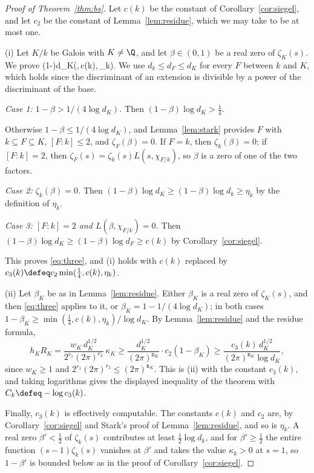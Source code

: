 \documentclass[11pt, reqno, twoside, letterpaper]{amsart}
\newcommand{\dK}{{\mathtt{n}_K}}
\newcommand{\Kf}{K}
\begin{document}
\begin{proof}[Proof of Theorem~\ref{thm:bs}]
Let $c(k)$ be the constant of Corollary~\ref{cor:siegel}, and let
$c_2$ be the constant of Lemma~\ref{lem:residue}, which we may take
to be at most one.

(i) Let $\Kf/k$ be Galois with $\Kf\ne\Q$, and let $\beta\in(0,1)$
be a real zero of $\zeta_\Kf(s)$. We prove
\be\label{eq:three}
(1-\beta)\log d_\Kf\ge\min\big(,\,c(k),\,\eta_k\big).
\ee
We use $d_k\le d_F\le d_\Kf$ for every
$F$ between $k$ and $\Kf$, which holds since the discriminant of an
extension is divisible by a power of the discriminant of the base.

\emph{Case 1: $1-\beta>1/(4\log d_\Kf)$.} Then
$(1-\beta)\log d_\Kf>\tfrac14$.

Otherwise $1-\beta\le 1/(4\log d_\Kf)$, and Lemma~\ref{lem:stark}
provides $F$ with $k\subseteq F\subseteq\Kf$, $[F:k]\le 2$, and
$\zeta_F(\beta)=0$. If $F=k$, then $\zeta_k(\beta)=0$; if $[F:k]=2$,
then $\zeta_F(s)=\zeta_k(s)L(s,\chi_{F/k})$, so $\beta$ is a zero of
one of the two factors.

\emph{Case 2: $\zeta_k(\beta)=0$.} Then
$(1-\beta)\log d_\Kf\ge(1-\beta)\log d_k\ge\eta_k$ by the definition
of $\eta_k$.

\emph{Case 3: $[F:k]=2$ and $L(\beta,\chi_{F/k})=0$.} Then
$(1-\beta)\log d_\Kf\ge(1-\beta)\log d_F\ge c(k)$ by
Corollary~\ref{cor:siegel}.

This proves \eqref{eq:three}, and (i) holds with
$c(k)$ replaced by $c_3(k)\defeq c_2\min(\tfrac14,c(k),\eta_k)$.

(ii) Let $\beta_\Kf$ be as in Lemma~\ref{lem:residue}. Either
$\beta_\Kf$ is a real zero of $\zeta_\Kf(s)$, and then
\eqref{eq:three} applies to it, or $\beta_\Kf=1-1/(4\log d_\Kf)$;
in both cases $1-\beta_\Kf\ge\min(\tfrac14,c(k),\eta_k)/\log d_\Kf$.
By Lemma~\ref{lem:residue} and the residue formula,
\[
h_\Kf R_\Kf=\frac{w_\Kf\,d_\Kf^{1/2}}{2^{r_1}(2\pi)^{r_2}}\,\kappa_\Kf
\ge\frac{d_\Kf^{1/2}}{(2\pi)^{\dK}}\cdot c_2(1-\beta_\Kf)
\ge\frac{c_3(k)\,d_\Kf^{1/2}}{(2\pi)^{\dK}\log d_\Kf},
\]
since $w_\Kf\ge 1$ and $2^{r_1}(2\pi)^{r_2}\le(2\pi)^{\dK}$. This is
(ii) with the constant $c_3(k)$, and taking logarithms gives the
displayed inequality of the theorem with $C_k\defeq-\log c_3(k)$.

Finally, $c_3(k)$ is effectively computable. The constants $c(k)$
and $c_2$ are, by Corollary~\ref{cor:siegel} and Stark's proof of
Lemma~\ref{lem:residue}, and so is $\eta_k$. A real zero
$\beta'<\tfrac12$ of $\zeta_k(s)$ contributes at least
$\tfrac12\log d_k$, and for $\beta'\ge\tfrac12$ the entire function
$(s-1)\zeta_k(s)$ vanishes at $\beta'$ and takes the value
$\kappa_k>0$ at $s=1$, so $1-\beta'$ is bounded below as in the
proof of Corollary~\ref{cor:siegel}.
\end{proof}
\end{document}
